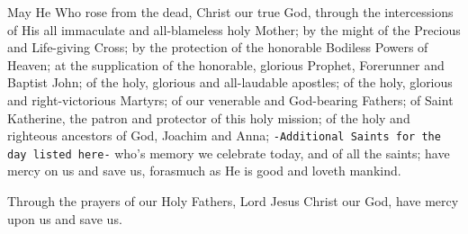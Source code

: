 \documentclass[twoside, letterpaper, 12pt]{report}
\newcommand{\instruction}[1]{%
  \texttt{\scriptsize{#1}}%
}
\begin{document}
\begin{priest}
\item May He Who rose from the dead, Christ our true God, through the intercessions of His all
    immaculate and all-blameless holy Mother; by the might of the Precious and Life-giving Cross;
    by the protection of the honorable Bodiless Powers of Heaven;
    at the supplication of the honorable, glorious Prophet, Forerunner and Baptist John;
    of the holy, glorious and all-laudable apostles;
    of the holy, glorious and right-victorious Martyrs;
    of our venerable and God-bearing Fathers;
    of Saint Katherine, the patron and protector of this holy mission;
    of the holy and righteous ancestors of God, Joachim and Anna;
    \instruction{-Additional Saints for the day listed here-} who's memory we celebrate today,
    and of all the saints;
    have mercy on us and save us, forasmuch as He is good and loveth mankind.
\item Through the prayers of our Holy Fathers, Lord Jesus Christ our God,
    have mercy upon us and save us.
\end{priest}
\end{document}
